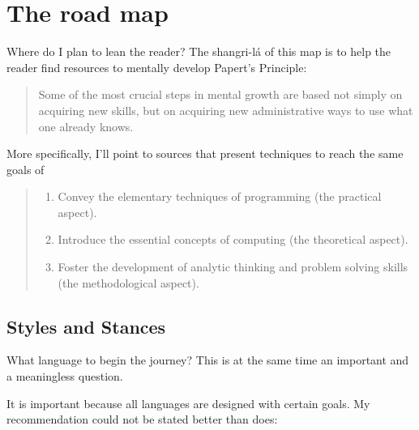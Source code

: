\section{The road map} 

Where do I plan to lean the reader? The shangri-lá of this map is 
to help the reader find resources to mentally develop Papert's Principle:

\begin{quotation}
Some of the most crucial steps in mental growth are based
not simply on acquiring new skills, but on acquiring new administrative ways to
use what one already knows. \cite{artificial_intelligence:minsky__society_of_mind}
\end{quotation}

More specifically, I'll point to sources that present techniques to reach the
same goals of \cite{education:keller__the_risks_and_benefits_of_teaching_purely_functional}


\begin{quote}
    \begin{enumerate}
    \item Convey the elementary techniques of programming (the practical aspect). 
    \item Introduce the essential concepts of computing (the theoretical aspect). 
    \item Foster the development of analytic thinking and problem solving skills (the methodological aspect).
    \end{enumerate}
\end{quote}

\subsection{Styles and Stances}

What language to begin the journey? This is at the same time an important and a
meaningless question. 

It is important because all languages are designed with certain goals. My
recommendation could not be stated better than
\cite{education:norvig__teach_yourself_programming} does:

